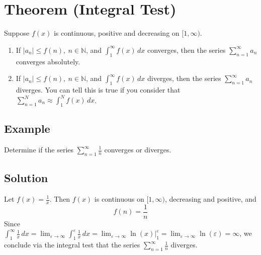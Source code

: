 \documentclass[11pt]{article}
\newcommand{\naturals}{\mathbb{N}}
\begin{document}
\section{Theorem (Integral Test)}
Suppose $f(x)$ is continuous, positive and decreasing on $[1, \infty)$.
\begin{enumerate}[ (i) ]
\item If $|a_n| \leq f(n),\ n \in \naturals$, and $\displaystyle{\int_1^\infty f(x)\, dx}$ converges, then the series $\displaystyle{\sum_{n=1}^\infty a_n}$ converges absolutely.

\item If $|a_n| \leq f(n),\ n \in \naturals$, and $\displaystyle{\int_1^\infty f(x)\, dx}$ diverges, then the series $\displaystyle{\sum_{n=1}^\infty a_n}$  diverges.
You can tell this is true if you consider that $\displaystyle{ \sum_{n=1}^N a_n \approx \int_1^N f(x)\, dx }$.
\end{enumerate}

\subsection{Example}
Determine if the series $\displaystyle{ \sum_{n=1}^\infty \frac{1}{n} }$ converges or diverges.

\subsection{Solution}
Let $f(x) = \frac{1}{x}$. Then $f(x)$ is continuous on $[1, \infty)$, decreasing and positive, and
$$f(n) = \frac{1}{n}$$
Since $\displaystyle{\int_1^\infty \frac{1}{x} \, dx = \lim_{\varepsilon \rightarrow \infty}  \int_1^\varepsilon \frac{1}{x} \, dx = \lim_{\varepsilon \rightarrow \infty} \left. \ln(x) \right|_1^\varepsilon = \lim_{\varepsilon \rightarrow \infty} \ln(\varepsilon) = \infty }$, we conclude via the integral test that the series $\displaystyle{ \sum_{n=1}^\infty \frac{1}{n} }$ diverges.
\end{document}
